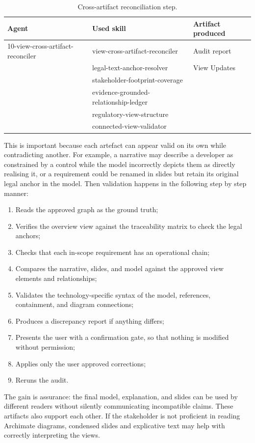 \begin{table}[bt]
\centering
\small
\begin{tabular}{p{5.2cm} p{5.5cm} p{3.5cm}}
\hline
\textbf{Agent} & \textbf{Used skill} & \textbf{Artifact produced} \\
\hline
10-view-cross-artifact-reconciler &
view-cross-artifact-reconciler &
Audit report \\
 &
legal-text-anchor-resolver &
View Updates \\
 &
stakeholder-footprint-coverage &
\\
 &
evidence-grounded-relationship-ledger &
\\
 &
regulatory-view-structure &
\\
 &
connected-view-validator &
\\
\hline
\end{tabular}
\caption{Cross-artifact reconciliation step.}
\label{tab:cross-artifact-reconciliation}
\end{table}

This is important because each artefact can appear valid on its own while contradicting another. For example, a narrative may describe a developer as constrained by a control while the model incorrectly depicts them as directly realising it, or a requirement could be renamed in slides but retain its original legal anchor in the model.
Then validation happens in the following step by step manner:
\begin{enumerate}
    \item Reads the approved graph as the ground truth;
    \item Verifies the overview view against the traceability matrix to check the legal anchors;
    \item Checks that each in-scope requirement has an operational chain;
    \item Compares the narrative, slides, and model against the approved view elements and relationships;
    \item Validates the technology-specific syntax of the model, references, containment, and diagram connections;
    \item Produces a discrepancy report if anything differs;
    \item Presents the user with a confirmation gate, so that nothing is modified without permission;
    \item Applies only the user approved corrections;
    \item Reruns the audit.
\end{enumerate}

The gain is assurance: the final model, explanation, and slides can be used by different readers without silently communicating incompatible claims. These artifacts also support each other. If the stakeholder is not proficient in reading Archimate diagrams, condensed slides and explicative text may help with correctly interpreting the views.